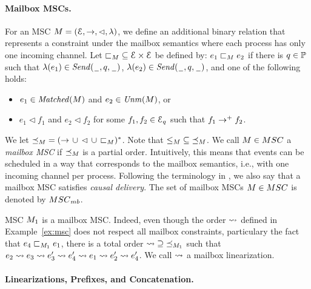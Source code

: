 \documentclass[a4paper,UKenglish,cleveref, autoref, thm-restate]{lipics-v2021}
\begin{document}
\paragraph*{Mailbox MSCs.}

For an MSC $M = (\mathcal{E},\to,\lhd,\lambda)$, we define
an additional binary relation that represents a constraint
under the mailbox semantics where each process has only one incoming channel.
Let ${\sqsubset}_M \subseteq \mathcal{E} \times \mathcal{E}$
be defined by: $e_1 \sqsubset_M e_2$ if there is $q \in \mathbb{P}$
such that $\lambda(e_1) \in {\mathit{Send}(\hspace{0.1em}\underline{\hspace{0.5em}}\hspace{0.1em},q,\hspace{0.1em}\underline{\hspace{0.5em}}\hspace{0.1em})}$,
$\lambda(e_2) \in {\mathit{Send}(\hspace{0.1em}\underline{\hspace{0.5em}}\hspace{0.1em},q,\hspace{0.1em}\underline{\hspace{0.5em}}\hspace{0.1em})}$, and one of the following holds:
\begin{itemize}\itemsep=0.5ex
\item $e_1 \in \mathit{Matched}(M)$ and $e_2 \in \mathit{Unm}(M)$, or
\item $e_1 \lhd f_1$ and $e_2 \lhd f_2$ for some $f_1,f_2 \in \mathcal{E}_q$ such that $f_1 \to^+ f_2$.
\end{itemize}

We let ${\preceq_M} = ({\to} \,\cup\, {\lhd} \,\cup\, {\sqsubset_M})^\ast$.
Note that ${\le_M} \subseteq {\preceq_M}$.
%
We call $\msc \in \ppMSCs$ a \emph{mailbox MSC}
if ${\preceq_M}$ is a partial order.
Intuitively, this means that events can be scheduled in a way that corresponds
to the mailbox semantics, i.e., with one incoming channel per process.
Following the terminology in \cite{DBLP:conf/cav/BouajjaniEJQ18}, we also say that
a mailbox MSC satisfies \emph{causal delivery}.
The set of mailbox MSCs $\msc \in \ppMSCs$ is denoted by $\cdMSCs$.

\begin{example}\label{ex:mailbox-msc}
  MSC $M_1$ is a mailbox MSC. Indeed, even though the order $\rightsquigarrow$ defined in Example~\ref{ex:msc} does not respect all mailbox constraints, particulary the fact that $e_4 \sqsubset_{M_1} e_1$, there is a total order $ {\rightsquigarrow} \supseteq {\preceq_{M_1}}$ such that $
  e_2 \rightsquigarrow e_3 \rightsquigarrow e_3' \rightsquigarrow e_4' \rightsquigarrow e_1 \rightsquigarrow e_2' \rightsquigarrow e_4'$. We call $\rightsquigarrow$ a mailbox linearization.
\end{example}

\paragraph*{Linearizations, Prefixes, and Concatenation.}
\end{document}
